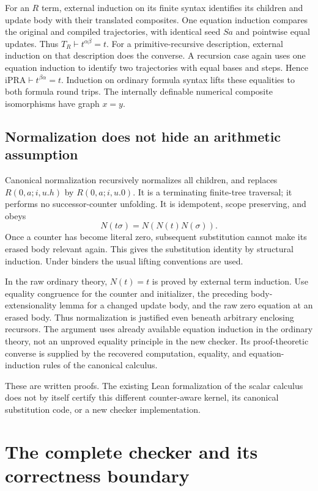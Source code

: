 \documentclass[10pt,letterpaper]{article}
\theoremstyle{definition}
\theoremstyle{remark}
\begin{document}
For an $R$ term, external induction on its finite syntax identifies its
children and update body with their translated composites. One equation
induction compares the original and compiled trajectories, with identical
seed $Sa$ and pointwise equal updates. Thus $T_R\vdash t^{\alpha\beta}=t$.
For a primitive-recursive description, external induction on that description
does the converse. A recursion case again uses one equation induction to
identify two trajectories with equal bases and steps. Hence
$\mathrm{iPRA}\vdash t^{\beta\alpha}=t$.
Induction on ordinary formula syntax lifts these equalities to both formula
round trips. The internally definable numerical composite isomorphisms have
graph $x=y$.

\subsection{Normalization does not hide an arithmetic assumption}\label{sec:normalization-soundness}

Canonical normalization recursively normalizes all children, and replaces
$R(0,a;i,u.h)$ by $R(0,a;i,u.0)$. It is a terminating finite-tree
traversal; it performs no successor-counter unfolding. It is idempotent,
scope preserving, and obeys
\[
 N(t\sigma)=N(N(t)N(\sigma)).
\]
Once a counter has become literal zero, subsequent substitution cannot make
its erased body relevant again. This gives the substitution identity by
structural induction. Under binders the usual lifting conventions are used.

In the raw ordinary theory, $N(t)=t$ is proved by external term induction.
Use equality congruence for the counter and initializer, the preceding
body-extensionality lemma for a changed update body, and the raw zero
equation at an erased body. Thus normalization is justified even beneath
arbitrary enclosing recursors. The argument uses already available equation
induction in the ordinary theory, not an unproved equality principle in the
new checker. Its proof-theoretic converse is supplied by the recovered
computation, equality, and equation-induction rules of the canonical calculus.

These are written proofs. The existing Lean formalization of the scalar
calculus does not by itself certify this different counter-aware kernel,
its canonical substitution code, or a new checker implementation.


\section{The complete checker and its correctness boundary}\label{sec:checker}
\end{document}

